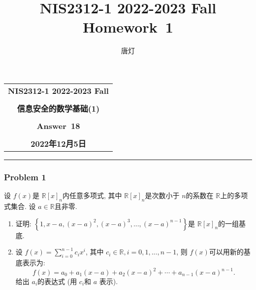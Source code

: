 \documentclass[a4paper,12pt]{ctexart}
\title{NIS2312-1 2022-2023 Fall Homework~1}
\author{唐灯}
\newcommand{\R}{\mathbb{R}}
\begin{document}
  \begin{center}

  \vspace{-0.3in}
  \begin{tabular}{c}
    \textbf{\Large NIS2312-1 2022-2023 Fall} \\
    \textbf{\Large  } \\
    \textbf{\Large  信息安全的数学基础(1)} \\
    \textbf{\Large  } \\
    \textbf{\Large  Answer~18} \\
    \textbf{\Large  } \\
    \textbf{\Large 2022年12月5日} \\
  \end{tabular}
  \end{center}
  \noindent
  \rule{\linewidth}{0.4pt}
  

\subsubsection*{Problem 1}
    设 $ f(x) $是 $ \R[x]_n $内任意多项式, 其中 $ \R[x]_n $是次数小于 $ n $的系数在 $ \R $上的多项式集合. 设 $ a\in\R $且非零. 
    \begin{enumerate}[label=(\arabic{*})]
      \item 证明: $ \left\{ 1,x-a,(x-a)^2,(x-a)^3,...,(x-a)^{n-1} \right\} $是 $ \R[x]_n $的一组基底.
      \item 设 $ f(x)=\sum_{i=0}^{n-1}c_ix^i $, 其中 $ c_i\in\R,i=0,1,...,n-1 $, 则 $ f(x) $可以用新的基底表示为: 
      \[ f(x)=a_0+a_1(x-a)+a_2(x-a)^2+\cdots+a_{n-1}(x-a)^{n-1}. \] 给出 $ a_i $的表达式 (用 $ c_i $和 $ a $ 表示).
    \end{enumerate}
\end{document}
